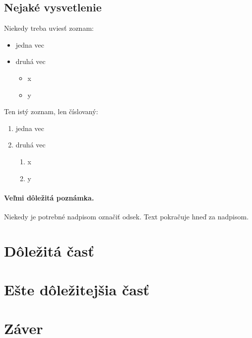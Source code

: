 \documentclass[10pt,twoside,slovak,a4paper]{article}
\begin{document}
\subsection{Nejaké vysvetlenie} \label{ina:nejake}

Niekedy treba uviesť zoznam:

\begin{itemize}
\item jedna vec
\item druhá vec
	\begin{itemize}
	\item x
	\item y
	\end{itemize}
\end{itemize}

Ten istý zoznam, len číslovaný:

\begin{enumerate}
\item jedna vec
\item druhá vec
	\begin{enumerate}
	\item x
	\item y
	\end{enumerate}
\end{enumerate}


\paragraph{Veľmi dôležitá poznámka.}
Niekedy je potrebné nadpisom označiť odsek. Text pokračuje hneď za nadpisom.



\section{Dôležitá časť} \label{dolezita}




\section{Ešte dôležitejšia časť} \label{dolezitejsia}




\section{Záver} \label{zaver} %






\end{document}
